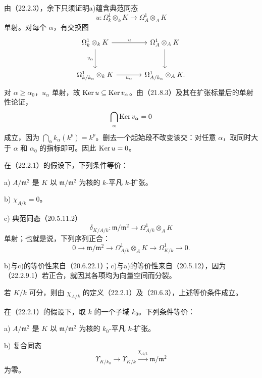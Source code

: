 由（22.2.3），余下只须证明a)蕴含典范同态
\[
 u:\Omega^1_k\otimes_k K\longrightarrow\Omega^1_A\otimes_A K
\]
单射。对每个 $\alpha$，有交换图
\[
\begin{tikzcd}[column sep=large,row sep=large]
 \Omega^1_k\otimes_k K\arrow[r,"u"]\arrow[d,"v_\alpha"']&
 \Omega^1_A\otimes_A K\arrow[d]\\
 \Omega^1_{k/k_\alpha}\otimes_k K\arrow[r,"u_\alpha"']&
 \Omega^1_{A/k_\alpha}\otimes_A K.
\end{tikzcd}
\]
对 $\alpha\ge\alpha_0$，$u_\alpha$ 单射，故 $\operatorname{Ker} u\subseteq\operatorname{Ker} v_\alpha$。由（21.8.3）及其在扩张标量后的单射性论证，
\[
 \bigcap_\alpha\operatorname{Ker} v_\alpha=0
\]
成立，因为 $\bigcap_\alpha k_\alpha(k^p)=k^p$。删去一个起始段不改变该交：对任意 $\alpha$，取同时大于 $\alpha$ 和 $\alpha_0$ 的指标即可。因此 $\operatorname{Ker} u=0$。
\finishproof

在（22.2.1）的假设下，下列条件等价：

\noindent a) $A/\mathfrak m^2$ 是 $K$ 以 $\mathfrak m/\mathfrak m^2$ 为核的 $k$-平凡 $k$-扩张。

\noindent b) $\chi_{A/k}=0$。

\noindent c) 典范同态（20.5.11.2）
\[
 \delta_{K/A/k}:\mathfrak m/\mathfrak m^2
 \longrightarrow\Omega^1_{A/k}\otimes_A K
\]
单射；也就是说，下列序列正合：
\begin{equation}
 0\longrightarrow\mathfrak m/\mathfrak m^2
 \longrightarrow\Omega^1_{A/k}\otimes_A K
 \longrightarrow\Omega^1_{K/k}\longrightarrow0.
 \tag{22.2.9.1}
\end{equation}

\eproof
b)与c)的等价性来自（20.6.22.1）；c)与a)的等价性来自（20.5.12），因为（22.2.9.1）若正合，就因其各项均为向量空间而分裂。
\finishproof

若 $K/k$ 可分，则由 $\chi_{A/k}$ 的定义（22.2.1）及（20.6.3），上述等价条件成立。

在（22.2.1）的假设下，取 $k$ 的一个子域 $k_0$。下列条件等价：

\noindent a) $A/\mathfrak m^2$ 是 $K$ 以 $\mathfrak m/\mathfrak m^2$ 为核的 $k_0$-平凡 $k$-扩张。

\noindent b) 复合同态
\[
 \Upsilon_{K/k_0}\longrightarrow\Upsilon_{K/k}
 \xrightarrow{\chi_{A/k}}\mathfrak m/\mathfrak m^2
\]
为零。

